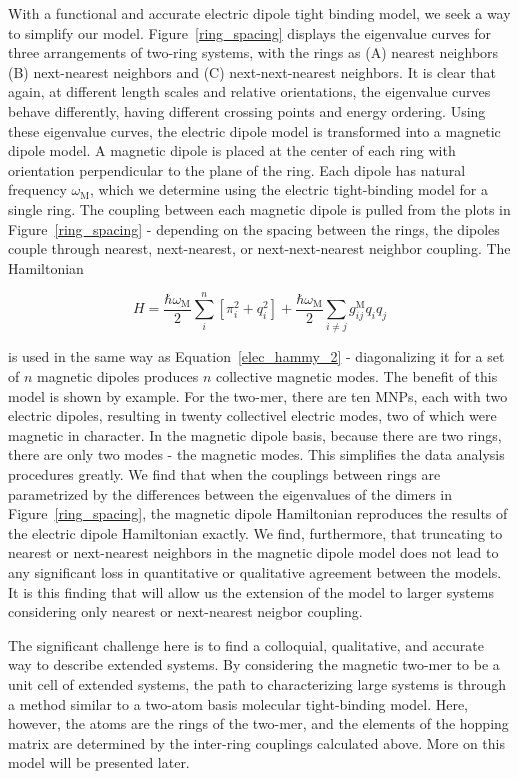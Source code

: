 \documentclass[journal=apchd5,manuscript=article]{achemso}
\begin{document}
With a functional and accurate electric dipole tight binding model, we seek a way to simplify our model. Figure~\ref{ring_spacing} displays the eigenvalue curves for three arrangements of two-ring systems, with the rings as (A) nearest neighbors (B) next-nearest neighbors and (C) next-next-nearest neighbors. It is clear that again, at different length scales and relative orientations, the eigenvalue curves behave differently, having different crossing points and energy ordering. Using these eigenvalue curves, the electric dipole model is transformed into a magnetic dipole model. A magnetic dipole is placed at the center of each ring with orientation perpendicular to the plane of the ring. Each dipole has natural frequency $\omega_{\textrm{M}}$, which we determine using the electric tight-binding model for a single ring. The coupling between each magnetic dipole is pulled from the plots in Figure~\ref{ring_spacing} - depending on the spacing between the rings, the dipoles couple through nearest, next-nearest, or next-next-nearest neighbor coupling. The Hamiltonian

\begin{equation}
H = \frac{\hbar\omega_{\textrm{M}}}{2}\sum_{i}^{n}[\pi_{i}^{2}+q_{i}^{2}]+\frac{\hbar\omega_{\textrm{M}}}{2}\sum_{i\neq j}g_{ij}^{\textrm{M}}q_{i}q_{j}
\label{mag_hammy}
\end{equation}

is used in the same way as Equation~\ref{elec_hammy_2} - diagonalizing it for a set of $n$ magnetic dipoles produces $n$ collective magnetic modes. The benefit of this model is shown by example. For the two-mer, there are ten MNPs, each with two electric dipoles, resulting in twenty collectivel electric modes, two of which were magnetic in character. In the magnetic dipole basis, because there are two rings, there are only two modes - the magnetic modes. This simplifies the data analysis procedures greatly. We find that when the couplings between rings are parametrized by the differences between the eigenvalues of the dimers in Figure~\ref{ring_spacing}, the magnetic dipole Hamiltonian reproduces the results of the electric dipole Hamiltonian exactly. We find, furthermore, that truncating to nearest or next-nearest neighbors in the magnetic dipole model does not lead to any significant loss in quantitative or qualitative agreement between the models. It is this finding that will allow us the extension of the model to larger systems considering only nearest or next-nearest neigbor coupling.

The significant challenge here is to find a colloquial, qualitative, and accurate way to describe extended systems. By considering the magnetic two-mer to be a unit cell of extended systems, the path to characterizing large systems is through a method similar to a two-atom basis molecular tight-binding model. Here, however, the atoms are the rings of the two-mer, and the elements of the hopping matrix are determined by the inter-ring couplings calculated above. More on this model will be presented later.
\end{document}
